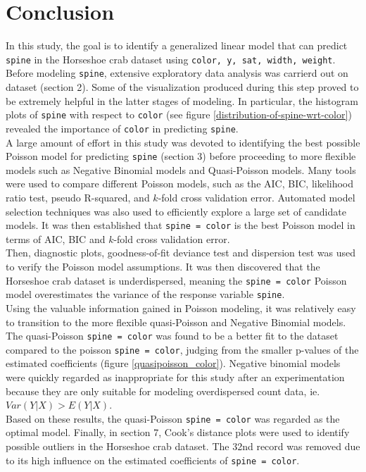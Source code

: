 \documentclass[a4paper, 12pt]{article}
\begin{document}
\section{Conclusion}
In this study, the goal is to identify a generalized linear model that can predict \texttt{spine} in the Horseshoe crab dataset using \texttt{color, y, sat, width, weight}. Before modeling \texttt{spine}, extensive exploratory data analysis was carrierd out on dataset (section 2). Some of the visualization produced during this step proved to be extremely helpful in the latter stages of modeling. In particular, the histogram plots of \texttt{spine} with respect to \texttt{color} (see figure \ref{distribution-of-spine-wrt-color}) revealed the importance of \texttt{color} in predicting \texttt{spine}. \\
\indent A large amount of effort in this study was devoted to identifying the best possible Poisson model for predicting \texttt{spine} (section 3) before proceeding to more flexible models such as Negative Binomial models and Quasi-Poisson models. Many tools were used to compare different Poisson models, such as the AIC, BIC, likelihood ratio test, pseudo R-squared, and $k$-fold cross validation error. Automated model selection techniques was also used to efficiently explore a large set of candidate models. It was then established that \texttt{spine = color} is the best Poisson model in terms of AIC, BIC and $k$-fold cross validation error. \\
\indent Then, diagnostic plots, goodness-of-fit deviance test and dispersion test was used to verify the Poisson model assumptions. It was then discovered that the Horseshoe crab dataset is underdispersed, meaning the \texttt{spine = color} Poisson model overestimates the variance of the response variable \texttt{spine}. \\
\indent Using the valuable information gained in Poisson modeling, it was relatively easy to transition to the more flexible quasi-Poisson and Negative Binomial models. The quasi-Poisson \texttt{spine = color} was found to be a better fit to the dataset compared to the poisson \texttt{spine = color}, judging from the smaller p-values of the estimated coefficients (figure \ref{quasipoisson_color}). Negative binomial models were quickly regarded as inappropriate for this study after an experimentation because they are only suitable for modeling overdispersed count data, ie. $Var(Y|X) > E(Y|X)$.  \\
\indent Based on these results, the quasi-Poisson \texttt{spine = color} was regarded as the optimal model. Finally, in section 7, Cook's distance plots were used to identify possible outliers in the Horseshoe crab dataset. The 32nd record was removed due to its high influence on the estimated coefficients of \texttt{spine = color}.
\end{document}
